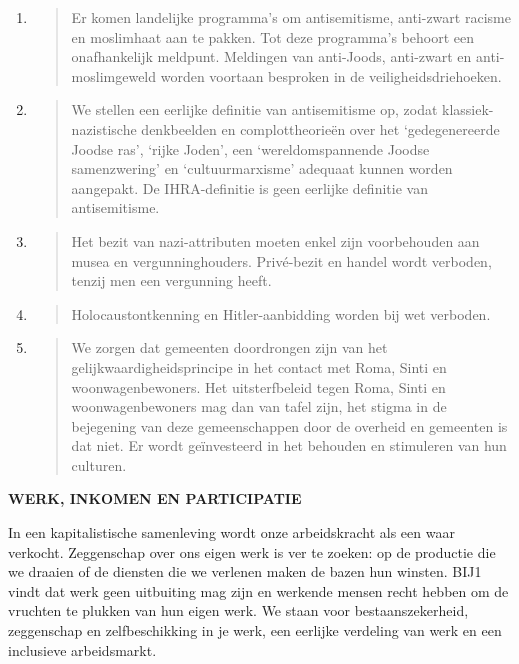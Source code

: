\begin{enumerate}
\def\labelenumi{\arabic{enumi}.}
\item
  \begin{quote}
  Er komen landelijke programma's om antisemitisme, anti-zwart racisme
  en moslimhaat aan te pakken. Tot deze programma's behoort een
  onafhankelijk meldpunt. Meldingen van anti-Joods, anti-zwart en
  anti-moslimgeweld worden voortaan besproken in de
  veiligheidsdriehoeken.
  \end{quote}
\item
  \begin{quote}
  We stellen een eerlijke definitie van antisemitisme op, zodat
  klassiek-nazistische denkbeelden en complottheorieën over het
  `gedegenereerde Joodse ras', `rijke Joden', een `wereldomspannende
  Joodse samenzwering' en `cultuurmarxisme' adequaat kunnen worden
  aangepakt. De IHRA-definitie is geen eerlijke definitie van
  antisemitisme.
  \end{quote}
\item
  \begin{quote}
  Het bezit van nazi-attributen moeten enkel zijn voorbehouden aan musea
  en vergunninghouders. Privé-bezit en handel wordt verboden, tenzij men
  een vergunning heeft.
  \end{quote}
\item
  \begin{quote}
  Holocaustontkenning en Hitler-aanbidding worden bij wet verboden.
  \end{quote}
\item
  \begin{quote}
  We zorgen dat gemeenten doordrongen zijn van het
  gelijkwaardigheidsprincipe in het contact met Roma, Sinti en
  woonwagenbewoners. Het uitsterfbeleid tegen Roma, Sinti en
  woonwagenbewoners mag dan van tafel zijn, het stigma in de bejegening
  van deze gemeenschappen door de overheid en gemeenten is dat niet. Er
  wordt geïnvesteerd in het behouden en stimuleren van hun culturen.
  \end{quote}
\end{enumerate}

\textbf{WERK, INKOMEN EN PARTICIPATIE}

In een kapitalistische samenleving wordt onze arbeidskracht als een waar
verkocht. Zeggenschap over ons eigen werk is ver te zoeken: op de
productie die we draaien of de diensten die we verlenen maken de bazen
hun winsten. BIJ1 vindt dat werk geen uitbuiting mag zijn en werkende
mensen recht hebben om de vruchten te plukken van hun eigen werk. We
staan voor bestaanszekerheid, zeggenschap en zelfbeschikking in je werk,
een eerlijke verdeling van werk en een inclusieve arbeidsmarkt.

